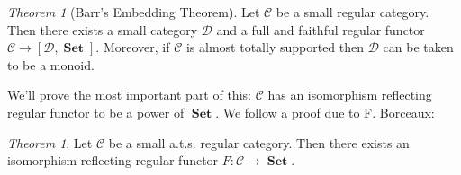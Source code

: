 \documentclass[a4paper]{article}
\theoremstyle{definition}
\theoremstyle{remark}
\theoremstyle{default}
\newtheorem{theorem}[definition]{Theorem}
\numberwithin{definition}{section}
\DeclareMathOperator{\Set}{\textbf{Set}}
\begin{document}
\begin{theorem}[Barr's Embedding Theorem]
	Let $\mathcal{C}$ be a small regular category.
	Then there exists a small category $\mathcal{D}$ and a full and faithful regular functor $\mathcal{C} \to [\mathcal{D}, \Set]$.
	Moreover, if $\mathcal{C}$ is almost totally supported then $\mathcal{D}$ can be taken to be a monoid.
\end{theorem}

We'll prove the most important part of this:
$\mathcal{C}$ has an isomorphism reflecting regular functor to be a power of $\Set$.
We follow a proof due to F. Borceaux:

\begin{theorem}
	Let $\mathcal{C}$ be a small a.t.s. regular category.
	Then there exists an isomorphism reflecting regular functor $F: \mathcal{C} \to \Set$.
	\label{610}
\end{theorem}
\end{document}
